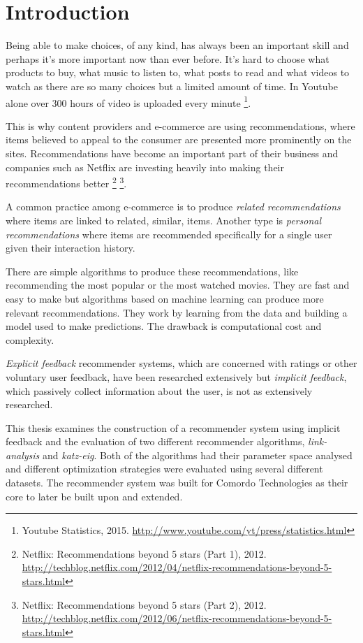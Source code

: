 
\section{Introduction}\label{sec:intro:intro}

Being able to make choices, of any kind, has always been an important skill and perhaps it's more important now than ever before. It's hard to choose what products to buy, what music to listen to, what posts to read and what videos to watch as there are so many choices but a limited amount of time. In Youtube alone over 300 hours of video is uploaded every minute
\footnote{Youtube Statistics, 2015. \url{http://www.youtube.com/yt/press/statistics.html}}.

This is why content providers and e-commerce are using recommendations, where items believed to appeal to the consumer are presented more prominently on the sites. Recommendations have become an important part of their business and companies such as Netflix are investing heavily into making their recommendations better
\footnote{
Netflix: Recommendations beyond 5 stars (Part 1), 2012.
\url{http://techblog.netflix.com/2012/04/netflix-recommendations-beyond-5-stars.html}
}
\footnote{
Netflix: Recommendations beyond 5 stars (Part 2), 2012.
\url{http://techblog.netflix.com/2012/06/netflix-recommendations-beyond-5-stars.html}
}.

A common practice among e-commerce is to produce \textit{related recommendations} where items are linked to related, similar, items. Another type is \textit{personal recommendations} where items are recommended specifically for a single user given their interaction history.

There are simple algorithms to produce these recommendations, like recommending the most popular or the most watched movies. They are fast and easy to make but algorithms based on machine learning can produce more relevant recommendations. They work by learning from the data and building a model used to make predictions. The drawback is computational cost and complexity.

\textit{Explicit feedback} recommender systems, which are concerned with ratings or other voluntary user feedback, have been researched extensively but \textit{implicit feedback}, which passively collect information about the user, is not as extensively researched. \citep{hu2008collaborative, bobadilla2013recommender}


This thesis examines the construction of a recommender system using implicit feedback and the evaluation of two different recommender algorithms, \textit{link-analysis} and \textit{katz-eig}. Both of the algorithms had their parameter space analysed and different optimization strategies were evaluated using several different datasets. The recommender system was built for Comordo Technologies as their core to later be built upon and extended.

